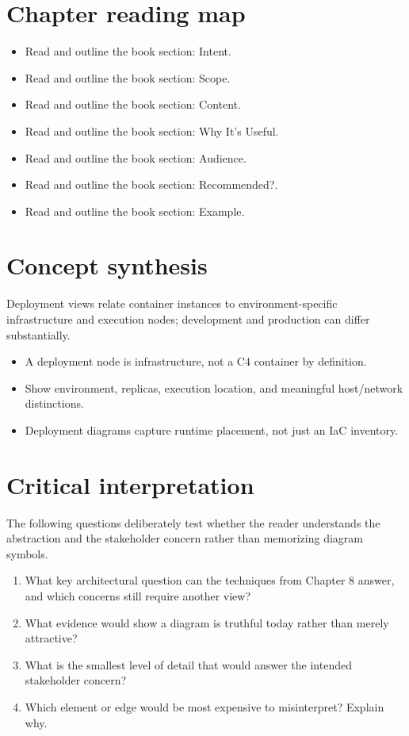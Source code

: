 \documentclass[10pt,letterpaper]{article}
\begin{document}
\section{Chapter reading map}
\begin{itemize}
\item Read and outline the book section: Intent.
\item Read and outline the book section: Scope.
\item Read and outline the book section: Content.
\item Read and outline the book section: Why It’s Useful.
\item Read and outline the book section: Audience.
\item Read and outline the book section: Recommended?.
\item Read and outline the book section: Example.
\end{itemize}

\section{Concept synthesis}
Deployment views relate container instances to environment-specific infrastructure and execution nodes; development and production can differ substantially.

\begin{itemize}
\item A deployment node is infrastructure, not a C4 container by definition.
\item Show environment, replicas, execution location, and meaningful host/network distinctions.
\item Deployment diagrams capture runtime placement, not just an IaC inventory.
\end{itemize}

\section{Critical interpretation}
The following questions deliberately test whether the reader understands the abstraction and the stakeholder concern rather than memorizing diagram symbols.

\begin{enumerate}
\item What key architectural question can the techniques from Chapter 8 answer, and which concerns still require another view?
\item What evidence would show a diagram is truthful today rather than merely attractive?
\item What is the smallest level of detail that would answer the intended stakeholder concern?
\item Which element or edge would be most expensive to misinterpret? Explain why.
\end{enumerate}
\end{document}
